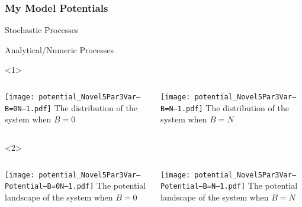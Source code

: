 \documentclass[aspectratio=169, onlytextwidth,  notheorems, sOuRcEs, fleqn, leqno, ]{RUCPresentation}
\begin{document}
\subsubsection{My Model Potentials}
\begin{frame}{ Stochastic Processes }


\end{frame}

\begin{frame}{ Analytical/Numeric Processes }

    \begin{onlyenv}<1>

        \begin{columns}
            \column{0.5\framewidth}
            \texttt{[image: potential\_Novel5Par3Var--B=0N--1.pdf]}
                The distribution of the system when \(B = 0\)


            \column{0.5\framewidth}
            \texttt{[image: potential\_Novel5Par3Var--B=N--1.pdf]}
                The distribution of the system when \(B = N\)

        \end{columns}

    \end{onlyenv}

    \begin{onlyenv}<2>

    \begin{columns}
        \column{0.5\framewidth}
                \texttt{[image: potential\_Novel5Par3Var--Potential--B=0N--1.pdf]}
                The potential landscape of the system when \(B = 0\)


        \column{0.5\framewidth}
                \texttt{[image: potential\_Novel5Par3Var--Potential--B=N--1.pdf]}
                The potential landscape of the system when \(B = N\)

    \end{columns}

\end{onlyenv}

\end{frame}
\end{document}

